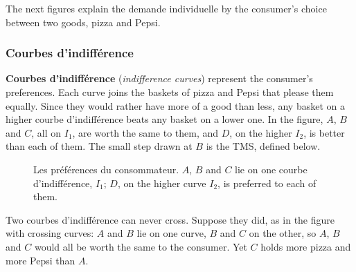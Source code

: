 The next figures explain the demande individuelle by the consumer's choice
between two goods, pizza and Pepsi.

\subsubsection{Courbes d'indifférence}

\textbf{Courbes d'indifférence} (\textit{indifference curves}) represent the
consumer's preferences. Each curve joins the baskets of pizza and Pepsi that please
them equally. Since they would rather have more of a good than less, any basket on a
higher courbe d'indifférence beats any basket on a lower one. In the figure, $A$,
$B$ and $C$, all on $I_1$, are worth the same to them, and $D$, on the higher $I_2$,
is better than each of them. The small step drawn at $B$ is the TMS, defined
below.\\

\begin{figure}[h!]
  \centering
  \caption*{\small Les préférences du consommateur. $A$, $B$ and $C$ lie on one
  courbe d'indifférence, $I_1$; $D$, on the higher curve $I_2$, is preferred to
  each of them.}
\end{figure}

Two courbes d'indifférence can never cross. Suppose they did, as in the figure
with crossing curves: $A$ and $B$ lie on one curve, $B$ and $C$ on the other, so
$A$, $B$ and $C$ would all be worth the same to the consumer. Yet $C$ holds more
pizza and more Pepsi than $A$.

